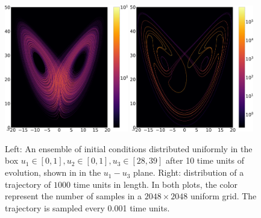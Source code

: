 \begin{figure}[H] \centering
\includegraphics[width=0.48\textwidth]{figure/lorenz_trajectory_1000.0.png}
\hspace{0.02\textwidth}
\includegraphics[width=0.48\textwidth]{figure/lorenz_ensemble_10.png}
\caption{
Left: An ensemble of initial conditions distributed uniformly in the box $u_1\in[0,1], u_2\in[0,1], u_3\in[28,39]$ 
after 10 time units of evolution, shown in in the $u_1-u_3$ plane.
Right: distribution of a trajectory of $1000$ time units in length.
In both plots, the color represent the number of samples in a
$2048\times2048$ uniform grid.  The trajectory is sampled every 0.001 time units.
}
\label{fig:lorenz_ergodicity1}
\end{figure}
